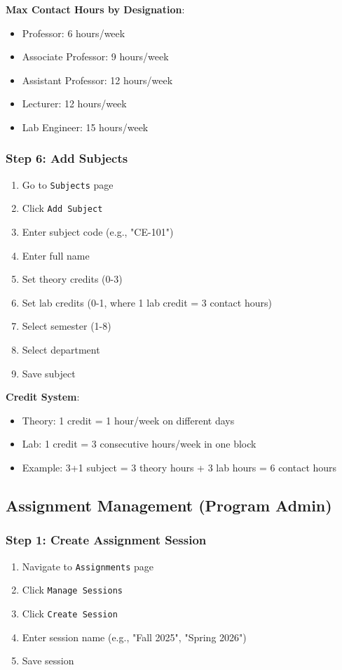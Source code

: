 \documentclass[12pt,a4paper]{article}
\begin{document}
\textbf{Max Contact Hours by Designation}:
\begin{itemize}
    \item Professor: 6 hours/week
    \item Associate Professor: 9 hours/week
    \item Assistant Professor: 12 hours/week
    \item Lecturer: 12 hours/week
    \item Lab Engineer: 15 hours/week
\end{itemize}

\subsubsection{Step 6: Add Subjects}
\begin{enumerate}
    \item Go to \texttt{Subjects} page
    \item Click \texttt{Add Subject}
    \item Enter subject code (e.g., "CE-101")
    \item Enter full name
    \item Set theory credits (0-3)
    \item Set lab credits (0-1, where 1 lab credit = 3 contact hours)
    \item Select semester (1-8)
    \item Select department
    \item Save subject
\end{enumerate}

\textbf{Credit System}:
\begin{itemize}
    \item Theory: 1 credit = 1 hour/week on different days
    \item Lab: 1 credit = 3 consecutive hours/week in one block
    \item Example: 3+1 subject = 3 theory hours + 3 lab hours = 6 contact hours
\end{itemize}


\subsection{Assignment Management (Program Admin)}

\subsubsection{Step 1: Create Assignment Session}
\begin{enumerate}
    \item Navigate to \texttt{Assignments} page
    \item Click \texttt{Manage Sessions}
    \item Click \texttt{Create Session}
    \item Enter session name (e.g., "Fall 2025", "Spring 2026")
    \item Save session
\end{enumerate}
\end{document}
